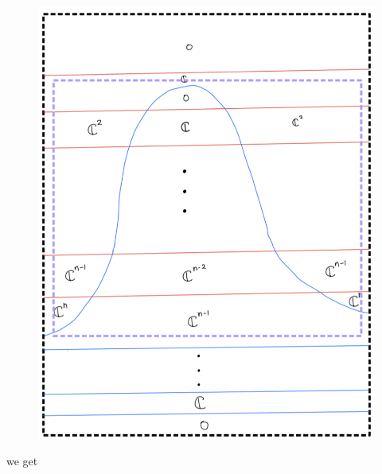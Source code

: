 \begin{enumerate}[label = (\roman*)]
\begin{enumerate}[label = (Step \arabic*)]
\begin{figure}[H]
    \centering
    \includegraphics[scale = 0.95]{diagrams/cobord_inter/6.png}
    \caption{}
    \label{fig:your-label}
\end{figure}
\pagebreak
we get


\end{enumerate}
\end{enumerate}
